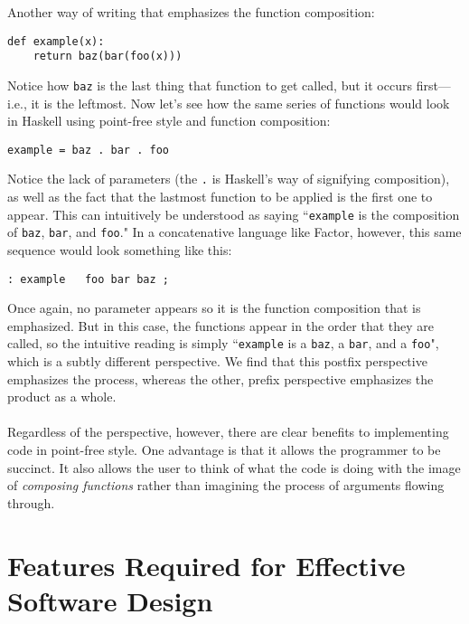 \documentclass{sig-alternate}
\begin{document}
Another way of writing that emphasizes the function composition: 
\begin{verbatim}
def example(x):
    return baz(bar(foo(x)))
\end{verbatim}

Notice how \texttt{baz} is the last thing that function to get called, but it occurs first---i.e., it is the leftmost. Now let's see how the same series of functions would look in Haskell using point-free style and function composition: 

\begin{verbatim}
example = baz . bar . foo
\end{verbatim}

Notice the lack of parameters (the \texttt{.} is Haskell's way of signifying composition), as well as the fact that the lastmost function to be applied is the first one to appear. This can intuitively be understood as saying ``\texttt{example} is the composition of \texttt{baz}, \texttt{bar}, and \texttt{foo}."  In a concatenative language like Factor, however, this same sequence would look something like this:

\begin{verbatim}
: example   foo bar baz ;
\end{verbatim}

Once again, no parameter appears so it is the function composition that is emphasized. But in this case, the functions appear in the order that they are called, so the intuitive reading is simply ``\texttt{example} is a \texttt{baz}, a \texttt{bar}, and a \texttt{foo}", which is a subtly different perspective. We find that this postfix perspective emphasizes the process, whereas the other, prefix perspective emphasizes the product as a whole. %
%
%
\\\\
Regardless of the perspective, however, there are clear benefits to implementing code in point-free style.  One advantage is that it allows the programmer to be succinct.  It also allows the user to think of what the code is doing with the image of \textit{composing functions} rather than imagining the process of arguments flowing through.

\section{Features Required for Effective Software Design} 
\end{document}
